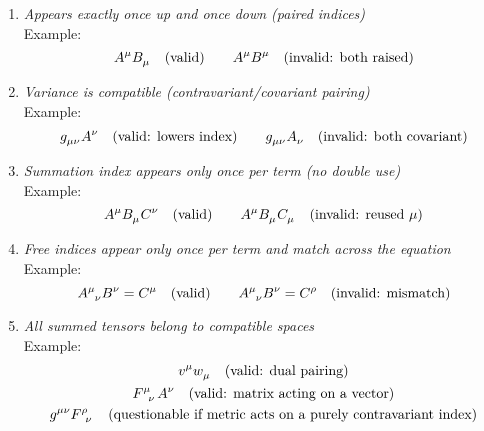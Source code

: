 \documentclass{amsart}
\theoremstyle{definition}
\theoremstyle{remark}
\begin{document}
\begin{enumerate}
  \item \emph{Appears exactly once up and once down (paired indices)}\\
  Example: 
  \begin{equation*}
  \tensor{A}{^\mu} \tensor{B}{_\mu} \quad \text{(valid)} \qquad 
  \tensor{A}{^\mu} \tensor{B}{^\mu} \quad \text{(invalid: both raised)}
  \end{equation*}

  \item \emph{Variance is compatible (contravariant/covariant pairing)}\\
  Example:
  \begin{equation*}
  \tensor{g}{_{\mu\nu}} \tensor{A}{^\nu} \quad \text{(valid: lowers index)} \qquad 
  \tensor{g}{_{\mu\nu}} \tensor{A}{_\nu} \quad \text{(invalid: both covariant)}
  \end{equation*}

  \item \emph{Summation index appears only once per term (no double use)}\\
  Example:
  \begin{equation*}
  \tensor{A}{^\mu} \tensor{B}{_\mu} \tensor{C}{^\nu} \quad \text{(valid)} \qquad 
  \tensor{A}{^\mu} \tensor{B}{_\mu} \tensor{C}{_\mu} \quad \text{(invalid: reused $\mu$)}
  \end{equation*}

  \item \emph{Free indices appear only once per term and match across the equation}\\
  Example:
  \begin{equation*}
  \tensor{A}{^\mu_\nu} \tensor{B}{^\nu} = \tensor{C}{^\mu} \quad \text{(valid)} \qquad 
  \tensor{A}{^\mu_\nu} \tensor{B}{^\nu} = \tensor{C}{^\rho} \quad \text{(invalid: mismatch)}
  \end{equation*}

  \item \emph{All summed tensors belong to compatible spaces}\\
  Example:
  \begin{gather*}
  \tensor{v}{^\mu} \tensor{w}{_\mu} \quad \text{(valid: dual pairing)} \\ 
  \tensor{F}{^\mu_\nu} \tensor{A}{^\nu} \quad \text{(valid: matrix acting on a vector)} \\
  \tensor{g}{^\mu^\nu} \tensor{F}{^\rho_\nu} \quad \text{(questionable if metric acts on a purely contravariant index)}
  \end{gather*}
\end{enumerate}
\end{document}
